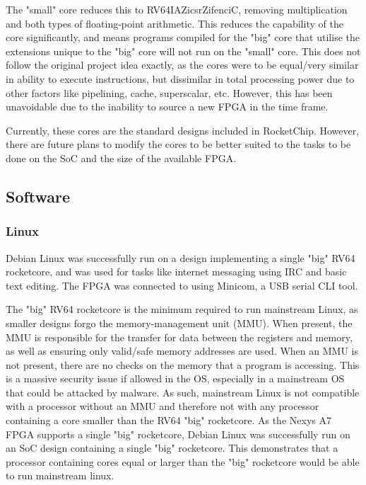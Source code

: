 The "small" core reduces this to RV64IAZicsrZifenciC\cite{riscv-1}, removing multiplication and both types of floating-point arithmetic. This reduces the capability of the core significantly, and means programs compiled for the "big" core that utilise the extensions unique to the "big" core will not run on the "small" core. This does not follow the original project idea exactly, as the cores were to be equal/very similar in ability to execute instructions, but dissimilar in total processing power due to other factors like pipelining, cache, superscalar, etc. However, this has been unavoidable due to the inability to source a new FPGA in the time frame.

Currently, these cores are the standard designs included in RocketChip\cite{rocketchip}. However, there are future plans to modify the cores to be better suited to the tasks to be done on the SoC and the size of the available FPGA.

\subsection{Software}
\subsubsection{Linux}
Debian Linux was successfully run on a design implementing a single "big" RV64 rocketcore, and was used for tasks like internet messaging using IRC\cite{irc} and basic text editing. The FPGA was connected to using Minicom\cite{minicom}, a USB serial CLI tool.

The "big" RV64 rocketcore is the minimum required to run mainstream Linux, as smaller designs forgo the memory-management unit (MMU). When present, the MMU is responsible for the transfer for data between the registers and memory, as well as ensuring only valid/safe memory addresses are used. When an MMU is not present, there are no checks on the memory that a program is accessing. This is a massive security issue if allowed in the OS, especially in a mainstream OS that could be attacked by malware. As such, mainstream Linux is not compatible with a processor without an MMU\cite{linux-memory} and therefore not with any processor containing a core smaller than the RV64 "big" rocketcore. As the Nexys A7 FPGA supports a single "big" rocketcore, Debian Linux\cite{debianriscv} was successfully run on an SoC design containing a single "big" rocketcore. This demonstrates that a processor containing cores equal or larger than the "big" rocketcore would be able to run mainstream linux.


